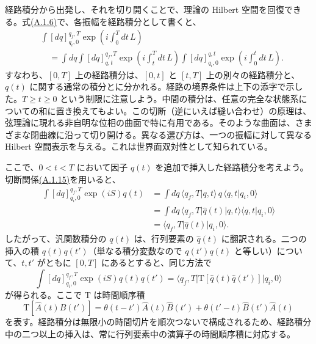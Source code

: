 
経路積分から出発し、それを切り開くことで、理論の Hilbert 空間を回復できる。式\hyperref[eq:A.1.6]{(A.1.6)}で、各振幅を経路積分として書くと、
\begin{equation}
\begin{aligned}
&\int[dq]_{q_i,0}^{q_f,T}
\exp\left(i\int_0^Tdt\,L\right)\\
&\quad=\int dq\int[dq]_{q,t}^{q_f,T}
\exp\left(i\int_t^Tdt\,L\right)
\int[dq]_{q_i,0}^{q,t}
\exp\left(i\int_0^tdt\,L\right).
\end{aligned}
\tag{A.1.15}\label{eq:A.1.15}
\end{equation}
すなわち、$[0,T]$ 上の経路積分は、$[0,t]$ と $[t,T]$ 上の別々の経路積分と、$q(t)$ に関する通常の積分とに分かれる。経路の境界条件は上下の添字で示した。$T\geq t\geq0$ という制限に注意しよう。中間の積分は、任意の完全な状態系についての和に置き換えてもよい。この切断（逆にいえば縫い合わせ）の原理は、弦理論に現れる非自明な位相の曲面で特に有用である。そのような曲面は、さまざまな閉曲線に沿って切り開ける。異なる選び方は、一つの振幅に対して異なる Hilbert 空間表示を与える。これは世界面双対性として知られている。

ここで、$0<t<T$ において因子 $q(t)$ を追加で挿入した経路積分を考えよう。切断関係\hyperref[eq:A.1.15]{(A.1.15)}を用いると、
\begin{equation}
\begin{aligned}
\int[dq]_{q_i,0}^{q_f,T}\exp(iS)q(t)
&=\int dq\,\langle q_f,T|q,t\rangle\,q\,\langle q,t|q_i,0\rangle\\
&=\int dq\,\langle q_f,T|\hat q(t)|q,t\rangle
\langle q,t|q_i,0\rangle\\
&=\langle q_f,T|\hat q(t)|q_i,0\rangle.
\end{aligned}
\tag{A.1.16}\label{eq:A.1.16}
\end{equation}
したがって、汎関数積分の $q(t)$ は、行列要素の $\hat q(t)$ に翻訳される。二つの挿入の積 $q(t)q(t')$（単なる積分変数なので $q(t')q(t)$ と等しい）について、$t,t'$ がともに $[0,T]$ にあるとすると、同じ方法で
\begin{equation}
\int[dq]_{q_i,0}^{q_f,T}\exp(iS)q(t)q(t')
=\langle q_f,T|\mathrm T[\hat q(t)\hat q(t')]|q_i,0\rangle
\tag{A.1.17}\label{eq:A.1.17}
\end{equation}
が得られる。ここで $\mathrm T$ は時間順序積
\begin{equation}
\mathrm T[\hat A(t)\hat B(t')]
=\theta(t-t')\hat A(t)\hat B(t')
+\theta(t'-t)\hat B(t')\hat A(t)
\tag{A.1.18}\label{eq:A.1.18}
\end{equation}
を表す。経路積分は無限小の時間切片を順次つないで構成されるため、経路積分中の二つ以上の挿入は、常に行列要素中の演算子の時間順序積に対応する。


